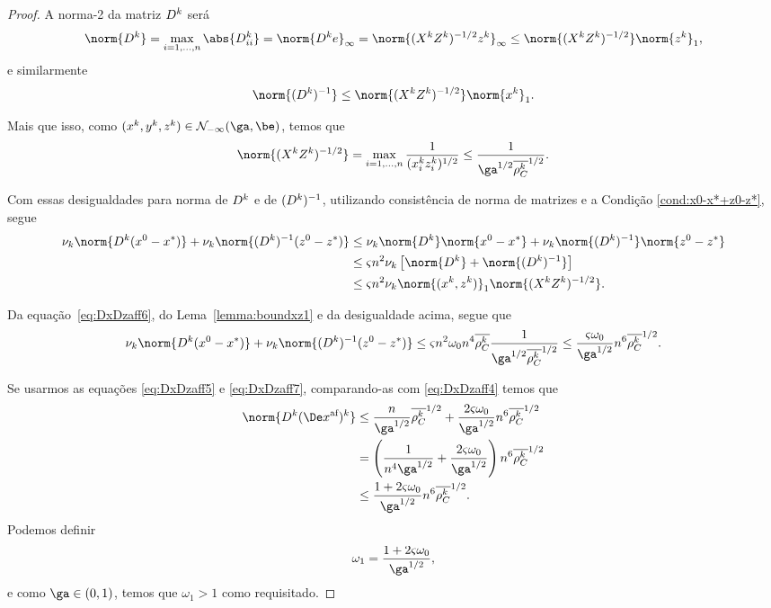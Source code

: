 \begin{proof}

A norma-2 da matriz  $D^{k}$ será
\[
 \norm{\Dk} = \max_{i=1,\ldots,n} \abs{\Dk_{ii}} = \norm{\Dk e}_{\infty} = \norm{(\Xk\Zk)^{-1/2}\zk}_{\infty} \leq \norm{(\Xk\Zk)^{-1/2}}\norm{\zk}_{1},
\]
e similarmente
\[
\norm{\Dik} \leq  \norm{(\Xk\Zk)^{-1/2}} \norm{\xk}_{1}.
\]

Mais que isso, como $(\xk,\yk,\zk)\in\Nset_{-\infty}(\ga,\be)$, temos que 
\begin{equation}
\label{eq:DxDzaff6}
	\norm{(\Xk\Zk)^{-1/2}} = \max_{i=1,\ldots,n}\frac{1}{(\xk_i\zk_i)^{1/2}} \leq \frac{1}{\ga^{1/2}\dbvec{\rho_{C}^k}^{1/2}}.
\end{equation}

Com essas desigualdades para norma de $D^{k}$ e de $(D^{k})^{-1}$, utilizando consistência de norma de matrizes e a Condição \ref{cond:x0-x*+z0-z*}, segue 
\[
\begin{aligned}
 \nu_k \norm{\Dk(\xzero - \xstar)} + \nu_k \norm{\Dik(\zzero - \zstar)}  & \leq \nu_k \norm{\Dk}\norm{\xzero - \xstar} + \nu_k \norm{\Dik}\norm{\zzero - \zstar} \notag \\
 					& \leq \bdxzstar n^2 \nu_k\left[  \norm{\Dk} + \norm{\Dik}   \right] \notag \\ 
 					& \leq \bdxzstar n^2 \nu_k\norm{(\xk,\zk)}_{1}\norm{(\Xk\Zk)^{-1/2}} .\notag
\end{aligned}
\]

Da equação~\eqref{eq:DxDzaff6}, do Lema~\ref{lemma:boundxz1} e da desigualdade acima, segue que 
\begin{equation} \label{eq:DxDzaff7}
 \nu_k \norm{\Dk(\xzero - \xstar)} + \nu_k \norm{\Dik(\zzero - \zstar)}  \leq \bdxzstar n^2 \omega_{0} n^{4} \dbvec{\rho_C^{k}}\frac{1}{\ga^{1/2}\dbvec{\rho_{C}^k}^{1/2}} \leq   \frac{\bdxzstar  \omega_{0}}{\ga^{1/2}} n^{6} \dbvec{\rho_C^{k}}^{1/2} .
\end{equation}

Se usarmos as equações \eqref{eq:DxDzaff5} e \eqref{eq:DxDzaff7}, comparando-as com \eqref{eq:DxDzaff4} temos que 
\[
\begin{aligned}
\norm{\Dk \dekx} & \leq \frac{n}{\ga^{1/2}}\dbvec{\rho_C^k }^{1/2} +  \frac{2\bdxzstar  \omega_{0}}{\ga^{1/2}} n^{6} \dbvec{\rho_C^{k}}^{1/2} \\
				& = \left( \frac{1}{n^{4}\ga^{1/2}} +  \frac{2\bdxzstar  \omega_{0}}{\ga^{1/2}} \right)n^{6} \dbvec{\rho_C^{k}}^{1/2}\\
				& \leq \frac{1 + 2\bdxzstar  \omega_{0}}{\ga^{1/2}} n^{6} \dbvec{\rho_C^{k}}^{1/2}.
\end{aligned}
\]
Podemos definir
\begin{equation}
	\label{eq:omega1}
	\omega_1 = \frac{1 + 2\bdxzstar  \omega_{0}}{\ga^{1/2}},
\end{equation}
e como  $\ga\in(0,1)$, temos que $\omega_1>1$ como requisitado.
\end{proof}

